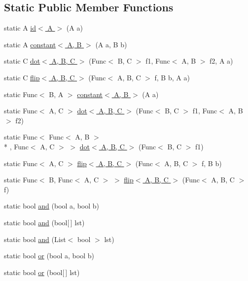 \subsection*{Static Public Member Functions}
\begin{DoxyCompactItemize}
\item 
static A \hyperlink{class_prelude_af7c1755d8c55c9d8150e1e2123368dad}{id$<$ A $>$} (A a)
\item 
static A \hyperlink{class_prelude_a8b1f148b46394a3e71b4876f8df3af7d}{constant$<$ A, B $>$} (A a, B b)
\item 
static C \hyperlink{class_prelude_ae379fcfb4a68d94841b76d29455d1b14}{dot$<$ A, B, C $>$} (Func$<$ B, C $>$ f1, Func$<$ A, B $>$ f2, A a)
\item 
static C \hyperlink{class_prelude_a92342e866dc228ab04463a95766b99fa}{flip$<$ A, B, C $>$} (Func$<$ A, B, C $>$ f, B b, A a)
\item 
static Func$<$ B, A $>$ \hyperlink{class_prelude_a7420c3c4b498d232da1d90d09f30ccdb}{constant$<$ A, B $>$} (A a)
\item 
static Func$<$ A, C $>$ \hyperlink{class_prelude_aa8a1f2c4b5ae243963943ec60f26e379}{dot$<$ A, B, C $>$} (Func$<$ B, C $>$ f1, Func$<$ A, B $>$ f2)
\item 
static Func$<$ Func$<$ A, B $>$\\*
, Func$<$ A, C $>$ $>$ \hyperlink{class_prelude_ae1d3fbc3f30ddba1dca19cea61ffbdb3}{dot$<$ A, B, C $>$} (Func$<$ B, C $>$ f1)
\item 
static Func$<$ A, C $>$ \hyperlink{class_prelude_ae838376d94dea8db4c408d3f367c87d5}{flip$<$ A, B, C $>$} (Func$<$ A, B, C $>$ f, B b)
\item 
static Func$<$ B, Func$<$ A, C $>$ $>$ \hyperlink{class_prelude_a332b9a17e92afc98ce26e3507c59f3b8}{flip$<$ A, B, C $>$} (Func$<$ A, B, C $>$ f)
\item 
static bool \hyperlink{class_prelude_a3a95865ab548355c49f552389ad6d22f}{and} (bool a, bool b)
\item 
static bool \hyperlink{class_prelude_aeaa38cbcbccc58405c342ea350111061}{and} (bool\mbox{[}$\,$\mbox{]} lst)
\item 
static bool \hyperlink{class_prelude_abe4c14539dacba5dcb3cedc1e8ef0f8d}{and} (List$<$ bool $>$ lst)
\item 
static bool \hyperlink{class_prelude_a144dfb3ece9c7639a521e8cbc1146d7c}{or} (bool a, bool b)
\item 
static bool \hyperlink{class_prelude_ac754fc43e11c4d7e73b5d774ec39eb66}{or} (bool\mbox{[}$\,$\mbox{]} lst)

\end{DoxyCompactItemize}
